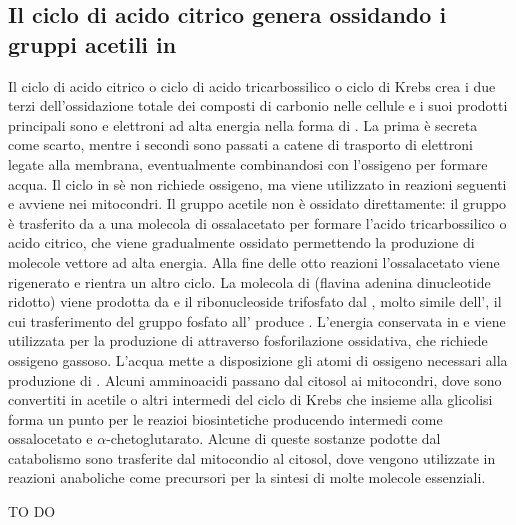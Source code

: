 \subsection{Il ciclo di acido citrico genera  ossidando i gruppi acetili in }
Il ciclo di acido citrico o ciclo di acido tricarbossilico o ciclo di Krebs crea i due terzi dell'ossidazione totale dei composti di carbonio nelle cellule e i suoi prodotti principali
sono  e elettroni ad alta energia nella forma di . La prima \`e secreta come scarto, mentre i secondi sono passati a catene di trasporto di elettroni legate alla 
membrana, eventualmente combinandosi con l'ossigeno per formare acqua. Il ciclo in s\`e non richiede ossigeno, ma viene utilizzato in reazioni seguenti e avviene nei mitocondri. Il 
gruppo acetile non \`e ossidato direttamente: il gruppo \`e trasferito da  a una molecola di ossalacetato per formare l'acido tricarbossilico o acido citrico, che viene
gradualmente ossidato permettendo la produzione di molecole vettore ad alta energia. Alla fine delle otto reazioni l'ossalacetato viene rigenerato e rientra un altro ciclo. La molecola
di  (flavina adenina dinucleotide ridotto) viene prodotta da  e il ribonucleoside trifosfato  dal , molto simile dell', il cui trasferimento 
del gruppo fosfato all' produce . L'energia conservata in  e  viene utilizzata per la produzione di  attraverso fosforilazione ossidativa, che
richiede ossigeno gassoso. L'acqua mette a disposizione gli atomi di ossigeno necessari alla produzione di . Alcuni amminoacidi passano dal citosol ai mitocondri, dove sono 
convertiti in acetile  o altri intermedi del ciclo di Krebs che insieme alla glicolisi forma un punto per le reazioi biosintetiche producendo intermedi come ossalocetato e 
$\alpha$-chetoglutarato. Alcune di queste sostanze podotte dal catabolismo sono trasferite dal mitocondio al citosol, dove vengono utilizzate in reazioni anaboliche come precursori
per la sintesi di molte molecole essenziali. 




\begin{Huge}
	TO DO
\end{Huge}

